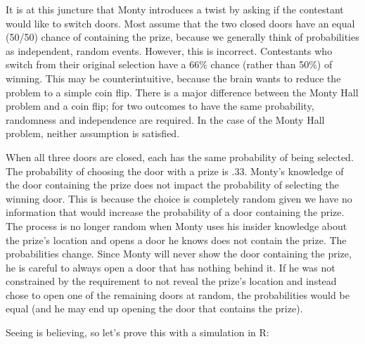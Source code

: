 \documentclass[]{book}
\begin{document}
It is at this juncture that Monty introduces a twist by asking if the contestant would like to switch doors. Most assume that the two closed doors have an equal (50/50) chance of containing the prize, because we generally think of probabilities as independent, random events. However, this is incorrect. Contestants who switch from their original selection have a 66\% chance (rather than 50\%) of winning. This may be counterintuitive, because the brain wants to reduce the problem to a simple coin flip. There is a major difference between the Monty Hall problem and a coin flip; for two outcomes to have the same probability, randomness and independence are required. In the case of the Monty Hall problem, neither assumption is satisfied.

When all three doors are closed, each has the same probability of being selected. The probability of choosing the door with a prize is .33. Monty's knowledge of the door containing the prize does not impact the probability of selecting the winning door. This is because the choice is completely random given we have no information that would increase the probability of a door containing the prize. The process is no longer random when Monty uses his insider knowledge about the prize's location and opens a door he knows does not contain the prize. The probabilities change. Since Monty will never show the door containing the prize, he is careful to always open a door that has nothing behind it. If he was not constrained by the requirement to not reveal the prize's location and instead chose to open one of the remaining doors at random, the probabilities would be equal (and he may end up opening the door that contains the prize).

Seeing is believing, so let's prove this with a simulation in R:
\end{document}
